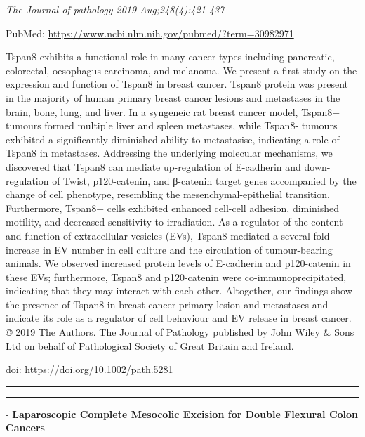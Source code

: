 \documentclass[]{article}
\begin{document}
\emph{The Journal of pathology 2019 Aug;248(4):421-437}

PubMed: \url{https://www.ncbi.nlm.nih.gov/pubmed/?term=30982971}

Tspan8 exhibits a functional role in many cancer types including
pancreatic, colorectal, oesophagus carcinoma, and melanoma. We present a
first study on the expression and function of Tspan8 in breast cancer.
Tspan8 protein was present in the majority of human primary breast
cancer lesions and metastases in the brain, bone, lung, and liver. In a
syngeneic rat breast cancer model, Tspan8+ tumours formed multiple liver
and spleen metastases, while Tspan8- tumours exhibited a significantly
diminished ability to metastasise, indicating a role of Tspan8 in
metastases. Addressing the underlying molecular mechanisms, we
discovered that Tspan8 can mediate up-regulation of E-cadherin and
down-regulation of Twist, p120-catenin, and β-catenin target genes
accompanied by the change of cell phenotype, resembling the
mesenchymal-epithelial transition. Furthermore, Tspan8+ cells exhibited
enhanced cell-cell adhesion, diminished motility, and decreased
sensitivity to irradiation. As a regulator of the content and function
of extracellular vesicles (EVs), Tspan8 mediated a several-fold increase
in EV number in cell culture and the circulation of tumour-bearing
animals. We observed increased protein levels of E-cadherin and
p120-catenin in these EVs; furthermore, Tspan8 and p120-catenin were
co-immunoprecipitated, indicating that they may interact with each
other. Altogether, our findings show the presence of Tspan8 in breast
cancer primary lesion and metastases and indicate its role as a
regulator of cell behaviour and EV release in breast cancer. © 2019 The
Authors. The Journal of Pathology published by John Wiley \& Sons Ltd on
behalf of Pathological Society of Great Britain and Ireland.

doi: \url{https://doi.org/10.1002/path.5281}

{}

{}

\begin{center}\rule{0.5\linewidth}{\linethickness}\end{center}

\begin{center}\rule{0.5\linewidth}{\linethickness}\end{center}

 - \textbf{Laparoscopic Complete Mesocolic Excision for Double Flexural
Colon Cancers}
\end{document}
